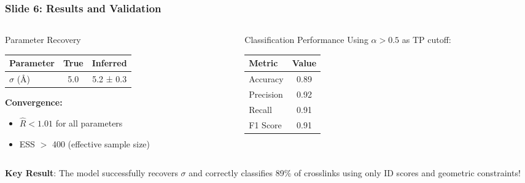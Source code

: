 \documentclass[a4paper,8pt]{beamer}
\begin{document}
\begin{frame}
\frametitle{Slide 6: Results and Validation}
\begin{columns}
\begin{column}{0.5\textwidth}
    \begin{block}{Parameter Recovery}
        \begin{table}
        \small
        \begin{tabular}{lcc}
        \toprule
        Parameter & True & Inferred \\
        \midrule
        $\sigma$ (Å) & 5.0 & 5.2 ± 0.3 \\
        \bottomrule
        \end{tabular}
        \end{table}
        
        \textbf{Convergence:}
        \begin{itemize}
            \item $\hat{R} < 1.01$ for all parameters
            \item ESS $>$ 400 (effective sample size)
        \end{itemize}
    \end{block}
\end{column}

\begin{column}{0.5\textwidth}
    \begin{block}{Classification Performance}
        Using $\alpha > 0.5$ as TP cutoff:
        \begin{table}
        \small
        \begin{tabular}{lc}
        \toprule
        Metric & Value \\
        \midrule
        Accuracy & 0.89 \\
        Precision & 0.92 \\
        Recall & 0.91 \\
        F1 Score & 0.91 \\
        \bottomrule
        \end{tabular}
        \end{table}
    \end{block}
\end{column}
\end{columns}

\vspace{0.3cm}

\begin{highlightbox}
    \textbf{Key Result}: The model successfully recovers $\sigma$ and correctly classifies 89\% of crosslinks using only ID scores and geometric constraints!
\end{highlightbox}
\end{frame}
\end{document}
